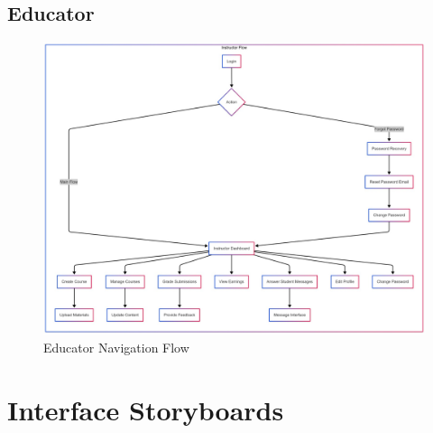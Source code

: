 \documentclass[a4paper, 11pt]{scrreprt}
\begin{document}
\subsection{Educator}
\begin{figure}[!htb]
    \centering
    \includegraphics[height=0.3\textheight]{UI/eduFlow.jpg}
    \caption{Educator Navigation Flow}
\end{figure}


\section{Interface Storyboards}
\end{document}
